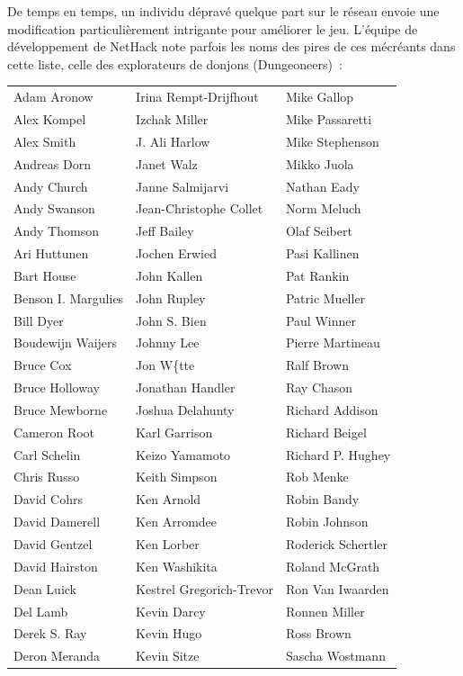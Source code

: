 \documentclass[titlepage]{article}
\begin{document}
De temps en temps, un individu dépravé quelque part sur le réseau envoie
une modification particulièrement intrigante pour améliorer le jeu.
L'équipe de développement de NetHack note parfois les noms des pires de
ces mécréants dans cette liste, celle des explorateurs de donjons
(Dungeoneers)~:
\medskip
\begin{longtable}{lll}
Adam Aronow & Irina Rempt-Drijfhout & Mike Gallop\\
Alex Kompel & Izchak Miller & Mike Passaretti\\
Alex Smith & J. Ali Harlow & Mike Stephenson\\
Andreas Dorn & Janet Walz & Mikko Juola\\
Andy Church & Janne Salmijarvi & Nathan Eady\\
Andy Swanson & Jean-Christophe Collet & Norm Meluch\\
Andy Thomson & Jeff Bailey & Olaf Seibert\\
Ari Huttunen & Jochen Erwied & Pasi Kallinen\\
Bart House & John Kallen & Pat Rankin\\
Benson I. Margulies & John Rupley & Patric Mueller\\
Bill Dyer & John S. Bien & Paul Winner\\
Boudewijn Waijers & Johnny Lee & Pierre Martineau\\
Bruce Cox & Jon W\{tte & Ralf Brown\\
Bruce Holloway & Jonathan Handler & Ray Chason\\
Bruce Mewborne & Joshua Delahunty & Richard Addison\\
Cameron Root & Karl Garrison & Richard Beigel\\
Carl Schelin & Keizo Yamamoto & Richard P. Hughey\\
Chris Russo & Keith Simpson & Rob Menke\\
David Cohrs & Ken Arnold & Robin Bandy\\
David Damerell & Ken Arromdee & Robin Johnson\\
David Gentzel & Ken Lorber & Roderick Schertler\\
David Hairston & Ken Washikita & Roland McGrath\\
Dean Luick & Kestrel Gregorich-Trevor & Ron Van Iwaarden\\
Del Lamb & Kevin Darcy & Ronnen Miller\\
Derek S. Ray & Kevin Hugo & Ross Brown\\
Deron Meranda & Kevin Sitze & Sascha Wostmann\\

\end{longtable}
\end{document}
